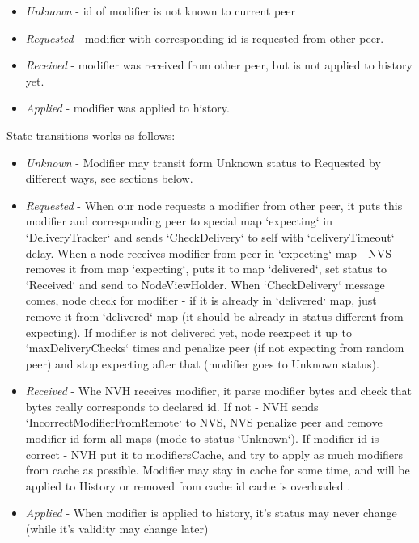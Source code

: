 \begin{itemize}
    \item{\em Unknown} - id of modifier is not known to current peer
    \item{\em Requested} - modifier with corresponding id is requested from other peer.
    \item{\em Received} - modifier was received from other peer, but is not applied to history yet.
    \item{\em Applied} - modifier was applied to history.
\end{itemize}

State transitions works as follows:
\begin{itemize}
    \item{\em Unknown} - Modifier may transit form Unknown status to Requested by different ways, see
    sections below.
    \item{\em Requested} - When our node requests a modifier from other peer, it puts this modifier and
    corresponding peer to special map `expecting` in `DeliveryTracker` and sends `CheckDelivery` to self
    with `deliveryTimeout` delay.
    When a node receives modifier from peer in `expecting` map - NVS removes it from map `expecting`,
    puts it to map `delivered`, set status to `Received` and send to NodeViewHolder.
    When `CheckDelivery` message comes, node check for modifier - if it is already in `delivered` map,
    just remove it from `delivered` map (it should be already in status different from expecting). If
    modifier is not delivered yet, node reexpect it up to `maxDeliveryChecks` times and penalize peer
    (if not expecting from random peer) and stop expecting after that (modifier goes to Unknown status).

    \item{\em Received} - Whe NVH receives modifier, it parse modifier bytes and check that bytes
    really corresponds to declared id.
    If not - NVH sends `IncorrectModifierFromRemote` to NVS, NVS penalize peer and remove modifier id
    form all maps (mode to status `Unknown`).
    If modifier id is correct - NVH put it to modifiersCache,
    and try to apply as much modifiers from cache as possible. Modifier may stay in cache for some time,
    and will be applied to History or removed from cache id cache is overloaded .
    \item{\em Applied} - When modifier is applied to history, it's status may never change (while it's validity
    may change later)
\end{itemize}
